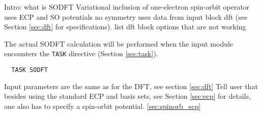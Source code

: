 \label{sec:sodft}



Intro: what is SODFT
       Variational inclusion of one-electron spin-orbit operator
       uses ECP and SO potentials
       no symmetry
       uses data from input block dft (see Section \ref{sec:dft} for specifications).
       list dft block options that are not working

 

The actual SODFT calculation will be performed when the input module
encounters the \verb+TASK+ directive (Section \ref{sec:task}).  

\begin{verbatim}
  TASK SODFT
\end{verbatim}

Input parameters are the same as for the DFT, see section \ref{sec:dft}
Tell user that besides using the standard ECP and basis sets, see Section \ref{sec:ecp} 
for details, one also has to specify a spin-orbit potential. \ref{sec:spinorb_ecp}


